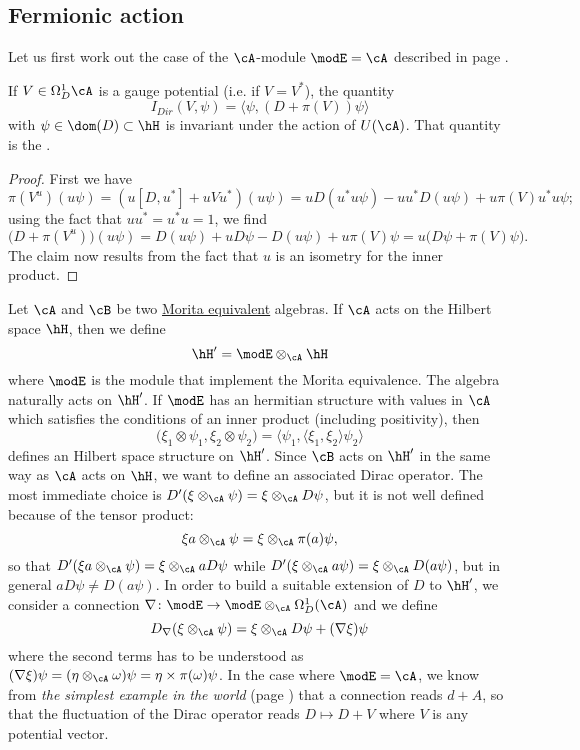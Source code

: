 \subsection{Fermionic action}

Let us first work out the case of the $\cA$-module $\modE=\cA$ described in page \pageref{PgSimplestwordl}.

\begin{theorem}
	If $V\in\Omega^1_D\cA$ is a gauge potential (i.e. if $V=V^*$), the quantity
	\begin{equation}
		I_{Dir}(V,\psi)=\langle \psi, (D+\pi(V))\psi\rangle
	\end{equation}
	with $\psi\in\dom(D)\subset\hH$ is invariant under the action of $U(\cA)$. That quantity is the .
\end{theorem}

\begin{proof}
	First we have
	\[
		\pi(V^u)(u\psi)=(u[D,u^*]+uVu^*)(u\psi)=uD(u^*u\psi)-uu^*D(u\psi)+u\pi(V)u^*u\psi;
	\]
	using the fact that $uu^*=u^*u=1$, we find
	\[
		\big( D+\pi(V^u) \big)(u\psi)=D(u\psi)+uD\psi-D(u\psi)+u\pi(V)\psi=u\big( D\psi+\pi(V)\psi \big).
	\]
	The claim now results from the fact that $u$ is an isometry for the inner product.
\end{proof}

Let $\cA$ and $\cB$ be two \hyperref[PgMoritaEq]{Morita equivalent} algebras. If $\cA$ acts on the Hilbert space $\hH$, then we define
\[
	\hH'=\modE\otimes_{\cA}\hH
\]
where $\modE$ is the module that implement the Morita equivalence. The algebra naturally acts on $\hH'$. If $\modE$ has an hermitian structure with values in $\cA$ which satisfies the conditions of an inner product (including positivity), then
\begin{equation}
	\big( \xi_1\otimes\psi_1,\xi_2\otimes\psi_2 \big)=\langle \psi_1, \langle \xi_1, \xi_2\rangle \psi_2\rangle
\end{equation}
defines an Hilbert space structure on $\hH'$. Since $\cB$ acts on $\hH'$ in the same way as $\cA$ acts on $\hH$, we want to define an associated Dirac operator. The most immediate choice is $D'(\xi\otimes_{\cA}\psi)=\xi\otimes_{\cA}D\psi$, but it is not well defined because of the tensor product:
\[
	\xi a\otimes_{\cA}\psi=\xi\otimes_{\cA}\pi(a)\psi,
\]
so that $D'(\xi a\otimes_{\cA}\psi)=\xi\otimes_{\cA}aD\psi$ while $D'(\xi\otimes_{\cA}a\psi)=\xi\otimes_{\cA}D(a\psi)$, but in general $aD\psi\neq D(a\psi)$. In order to build a suitable extension of $D$ to $\hH'$, we consider a connection $\nabla\colon \modE\to \modE\otimes_{\cA}\Omega^1_D(\cA)$ and we define
\[
	D_{\nabla}(\xi\otimes_{\cA}\psi)=\xi\otimes_{\cA}D\psi+(\nabla\xi)\psi
\]
where the second terms has to be understood as $(\nabla\xi)\psi=(\eta\otimes_{\cA}\omega)\psi=\eta\times\pi(\omega)\psi$. In the case where $\modE=\cA$, we know from \emph{the simplest example in the world} (page \pageref{ConnEequalAsime}) that a connection reads $d+A$, so that the fluctuation of the Dirac operator reads $D\mapsto D+V$ where $V$ is any potential vector.


